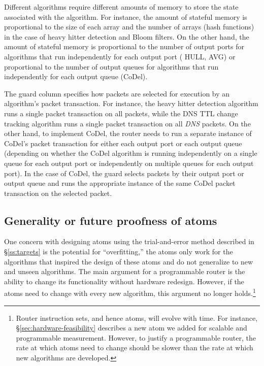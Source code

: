 Different algorithms require different amounts of memory to store the state
associated with the algorithm. For instance, the amount of stateful memory is
proportional to the size of each array and the number of arrays (hash
functions) in the case of heavy hitter detection and Bloom filters. On the
other hand, the amount of stateful memory is proportional to the number of
output ports for algorithms that run independently for each output port (\eg
HULL, AVG) or proportional to the number of output queues for algorithms that
run independently for each output queue (\eg CoDel).

The guard column specifies how packets are selected for execution by an
algorithm's packet transaction. For instance, the heavy hitter detection
algorithm runs a single packet transaction on all packets, while the DNS TTL
change tracking algorithm runs a single packet transaction on all {\em DNS}
packets. On the other hand, to implement CoDel, the router needs to run a
separate instance of CoDel's packet transaction for either each output port or
each output queue (depending on whether the CoDel algorithm is running
independently on a single queue for each output port or independently on
multiple queues for each output port). In the case of CoDel, the guard selects
packets by their output port or output queue and runs the appropriate instance
of the same CoDel packet transaction on the selected packet.

\subsection{Generality or future proofness of atoms}

One concern with designing atoms using the trial-and-error method described in
\S\ref{ss:targets} is the potential for ``overfitting,'' \ie  the atoms only
work for the algorithms that inspired the design of these atoms and do not
generalize to new and unseen algorithms. The main argument for a programmable
router is the ability to change its functionality without hardware redesign.
However, if the atoms need to change with every new algorithm, this argument no
longer holds.\footnote{Router instruction sets, and hence atoms, will evolve
with time. For instance, \S\ref{sec:hardware-feasibility} describes a new atom
we added for scalable and programmable measurement. However, to justify a
programmable router, the rate at which atoms need to change should be slower
than the rate at which new algorithms are developed.}

